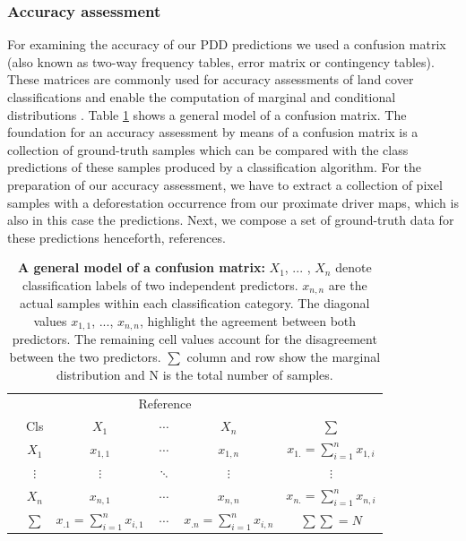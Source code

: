 		\subsubsection{Accuracy assessment}
			For examining the accuracy of our \ac{PDD} predictions we used a confusion matrix (also known as two-way frequency tables, error matrix or contingency tables). These matrices are commonly used for accuracy assessments of land cover classifications and enable the computation of marginal and conditional distributions \citep{Congalton1991,Foody2002}. Table \ref{tab:methods_confusion_matrix} shows a general model of a confusion matrix. The foundation for an accuracy assessment by means of a confusion matrix is a collection of ground-truth samples which can be compared with the class predictions of these samples produced by a classification algorithm. For the preparation of our accuracy assessment, we have to extract a collection of pixel samples with a deforestation occurrence from our proximate driver maps, which is also in this case the predictions. Next, we compose a set of ground-truth data for these predictions henceforth, references.
			\begin{table}[ht]
				\centering
				\caption[A general model of a confusion matrix]{\textbf{A general model of a confusion matrix:} $X_1$, ... , $X_n$ denote classification labels of two independent predictors. $x_{n,n}$ are the actual samples within each classification category. The diagonal values $x_{1,1}$, ..., $x_{n,n}$, highlight the agreement between both predictors. The remaining cell values account for the disagreement between the two predictors. $\sum$ column and row show the marginal distribution and N is the total number of samples.}
				\label{tab:methods_confusion_matrix}
				\begin{tabular}{lccccc}
					\hline
					& & \multicolumn{3}{c}{Reference} & \\
					& Cls & $X_1$ & $\cdots$ & $X_n$ & $\sum$ \\\hline
					\multirow{4}{*}{\STAB{\rotatebox[origin=c]{90}{Predict}}}
					& $X_1$ & $x_{1,1}$ & $\cdots$ & $x_{1,n}$ & $x_{1.}=
					\displaystyle\sum_{i=1}^{n} x_{1,i}$ \\ 
					& $\vdots$ & $\vdots$ & $\ddots$ & $\vdots$ & $\vdots$ \\ 
					& $X_n$ & $x_{n,1}$ & $\cdots$ & $x_{n,n}$ & $x_{n.}=\displaystyle\sum_{i=1}^{n}x_{n,i}$ \\\hline 
					& $\sum$ & $x_{.1}=\displaystyle\sum_{i=1}^{n}x_{i,1}$ & $\cdots$ & $x_{.n}=\displaystyle\sum_{i=1}^{n}x_{i,n}$ & $\sum\sum=N$ \\\hline
				\end{tabular}
			\end{table}

